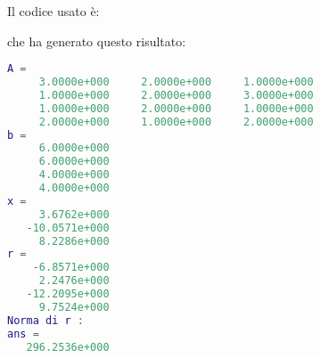 Il codice usato è:

che ha generato questo risultato:
   \begin{lstlisting}[language=matlab, basicstyle = \small]
A =
     3.0000e+000     2.0000e+000     1.0000e+000
     1.0000e+000     2.0000e+000     3.0000e+000
     1.0000e+000     2.0000e+000     1.0000e+000
     2.0000e+000     1.0000e+000     2.0000e+000
b =
     6.0000e+000
     6.0000e+000
     4.0000e+000
     4.0000e+000
x =
     3.6762e+000
   -10.0571e+000
     8.2286e+000
r =
    -6.8571e+000
     2.2476e+000
   -12.2095e+000
     9.7524e+000
Norma di r : 
ans =
   296.2536e+000
\end{lstlisting}